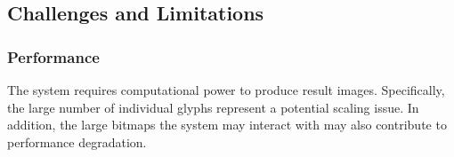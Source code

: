 \subsection{Challenges and Limitations}
\subsubsection{Performance}
The system requires computational power to produce result images.
Specifically, the large number of individual glyphs represent a potential scaling issue.
In addition, the large bitmaps the system may interact with may also contribute to performance degradation.
